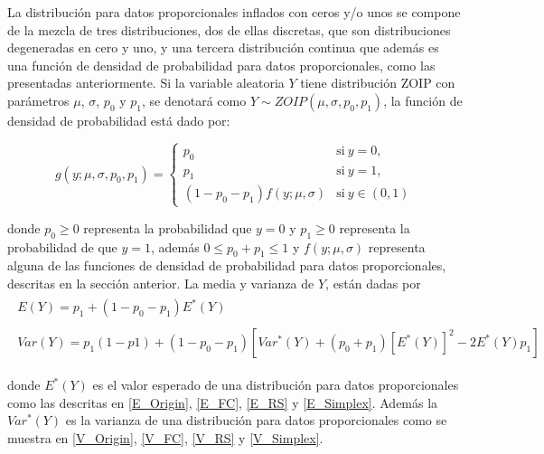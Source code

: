La distribuci\'{o}n para datos proporcionales inflados con ceros y/o unos se compone de la mezcla de tres distribuciones, dos de ellas discretas, que son distribuciones degeneradas en cero y uno, y una tercera distribuci\'{o}n continua que adem\'{a}s es una funci\'{o}n de densidad de probabilidad para datos proporcionales, como las presentadas anteriormente. Si la variable aleatoria $Y$ tiene distribuci\'{o}n ZOIP con par\'{a}metros $\mu$, $\sigma$, $p_0$ y $p_1$, se denotar\'{a} como $Y \sim ZOIP(\mu,\sigma, p_0, p_1)$, la funci\'{o}n de densidad de probabilidad est\'{a} dado por:

\begin{equation}
g(y;\mu,\sigma, p_{0}, p_{1})=
\begin{cases}
p_{0} & \text{si}\ y=0,\\
p_{1} & \text{si}\ y=1,\\
(1-p_{0}-p_{1})f(y;\mu,\sigma) & \text{si}\ y \in (0,1)
\end{cases}
 \label{eq_Dist_ZOIP}
\end{equation}

donde $p_{0} \geq 0$ representa la probabilidad que $y=0$ y $p_{1} \geq 0$ representa la probabilidad de que $y=1$, adem\'{a}s $0\leq p_{0}+p_{1}\leq 1$ y $f(y;\mu,\sigma)$ representa alguna de las funciones de densidad de probabilidad para datos proporcionales, descritas en la secci\'{o}n anterior. La media y varianza de $Y$, est\'{a}n dadas por
\begin{align}
\begin{split}
	E(Y) = p_1+(1-p_0-p_1)E^*(Y)
\end{split} \label{E_DZOIP} \\
\begin{split}
	Var(Y) = p_1(1-p1)+(1-p_0-p_1)\left[Var^*(Y)+(p_0+p_1)[E^*(Y)]^2-2E^*(Y)p_1\right]
\end{split} \label{V_DZOIP}
\end{align}

%

donde $E^*(Y)$ es el valor esperado de una distribuci\'{o}n para datos proporcionales como las des\-cri\-tas en \eqref{E_Origin}, \eqref{E_FC}, \eqref{E_RS} y \eqref{E_Simplex}. Adem\'{a}s la $Var^*(Y)$ es la varianza de una distribuci\'{o}n para datos proporcionales como se muestra en \eqref{V_Origin}, \eqref{V_FC}, \eqref{V_RS} y \eqref{V_Simplex}.\\

